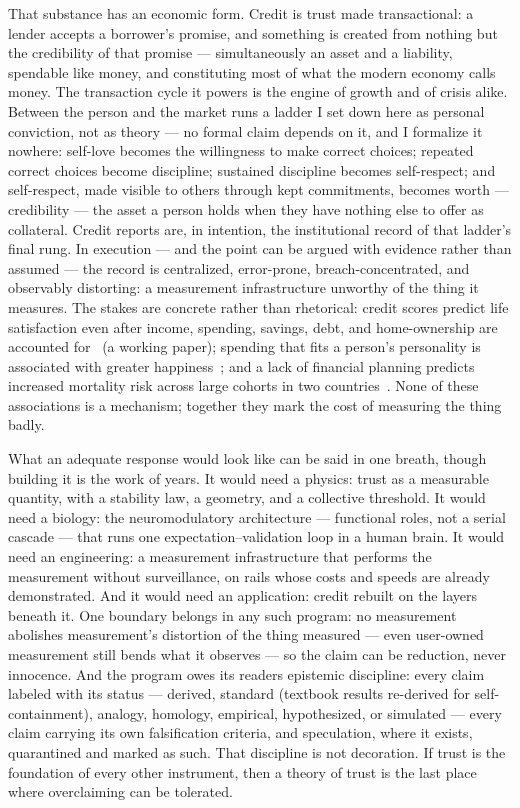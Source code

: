 \documentclass[11pt]{article}
\begin{document}
That substance has an economic form. Credit is trust made transactional: a lender accepts a borrower's promise, and something is created from nothing but the credibility of that promise --- simultaneously an asset and a liability, spendable like money, and constituting most of what the modern economy calls money. The transaction cycle it powers is the engine of growth and of crisis alike. Between the person and the market runs a ladder I set down here as personal conviction, not as theory --- no formal claim depends on it, and I formalize it nowhere: self-love becomes the willingness to make correct choices; repeated correct choices become discipline; sustained discipline becomes self-respect; and self-respect, made visible to others through kept commitments, becomes worth --- credibility --- the asset a person holds when they have nothing else to offer as collateral. Credit reports are, in intention, the institutional record of that ladder's final rung. In execution --- and the point can be argued with evidence rather than assumed --- the record is centralized, error-prone, breach-concentrated, and observably distorting: a measurement infrastructure unworthy of the thing it measures. The stakes are concrete rather than rhetorical: credit scores predict life satisfaction even after income, spending, savings, debt, and home-ownership are accounted for~\cite{gladstone2018} (a working paper); spending that fits a person's personality is associated with greater happiness~\cite{matz2016}; and a lack of financial planning predicts increased mortality risk across large cohorts in two countries~\cite{gladstone2023mortality}. None of these associations is a mechanism; together they mark the cost of measuring the thing badly.

What an adequate response would look like can be said in one breath, though building it is the work of years. It would need a physics: trust as a measurable quantity, with a stability law, a geometry, and a collective threshold. It would need a biology: the neuromodulatory architecture --- functional roles, not a serial cascade --- that runs one expectation--validation loop in a human brain. It would need an engineering: a measurement infrastructure that performs the measurement without surveillance, on rails whose costs and speeds are already demonstrated. And it would need an application: credit rebuilt on the layers beneath it. One boundary belongs in any such program: no measurement abolishes measurement's distortion of the thing measured --- even user-owned measurement still bends what it observes --- so the claim can be reduction, never innocence. And the program owes its readers epistemic discipline: every claim labeled with its status --- derived, standard (textbook results re-derived for self-containment), analogy, homology, empirical, hypothesized, or simulated --- every claim carrying its own falsification criteria, and speculation, where it exists, quarantined and marked as such. That discipline is not decoration. If trust is the foundation of every other instrument, then a theory of trust is the last place where overclaiming can be tolerated.
\end{document}
